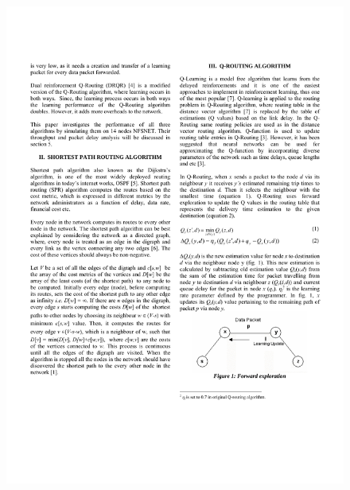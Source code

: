 \documentclass{standalone}
\begin{document}
\begin{figure}[H]
    \centering
    \includegraphics[width=14.5cm]{pic/translate/page-2.pdf}
\end{figure}
\end{document}

